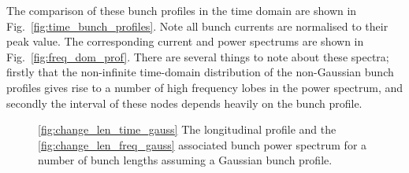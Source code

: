 The comparison of these bunch profiles in the time domain are shown in Fig.~\ref{fig:time_bunch_profiles}. Note all bunch currents are normalised to their peak value. The corresponding current and power spectrums are shown in Fig.~\ref{fig:freq_dom_prof}. There are several things to note about these spectra; firstly that the non-infinite time-domain distribution of the non-Gaussian bunch profiles gives rise to a number of high frequency lobes in the power spectrum, and secondly the interval of these nodes depends heavily on the bunch profile.

\begin{figure}
\caption{\ref{fig:change_len_time_gauss} The longitudinal profile and the \ref{fig:change_len_freq_gauss} associated bunch power spectrum for a number of bunch lengths assuming a Gaussian bunch profile.}
\label{fig:diff_bunch_len_gauss}
\end{figure}

